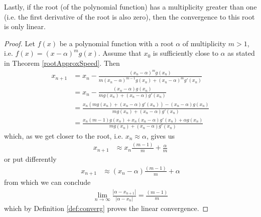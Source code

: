 \documentclass[
  digital, %
  notable,   %
  nolof,     %
  nolot,     %
	final, %
]{fithesis3}
\begin{document}
Lastly, if the root (of the polynomial function) has a multiplicity greater than one (i.e. the first derivative of the root is also zero), then the convergence to this root is only linear.
\begin{proof}
Let $f(x)$ be a polynomial function with a root $\alpha$ of multiplicity $m > 1$, i.e. $f(x) = (x-\alpha)^{m}g(x)$. Assume that $x_{0}$ is sufficiently close to $\alpha$ as stated in Theorem \ref{rootApproxSpeed}. Then
\begin{align}
x_{n+1} &= x_{n} - \frac{(x_{n} - \alpha)^{m}g(x_{n})}{m(x_{n}-\alpha)^{m-1}g(x_{n}) + (x_{n}-\alpha)^{m}g'(x_{n})} \\
&= x_{n} - \frac{(x_{n} - \alpha)g(x_{n})}{mg(x_{n}) + (x_{n}-\alpha)g'(x_{n})} \\
&= \frac{x_{n}(mg(x_{n}) + (x_{n}-\alpha)g'(x_{n})) - (x_{n} - \alpha)g(x_{n})}{mg(x_{n}) + (x_{n}-\alpha)g'(x_{n})} \\
&= \frac{x_{n}(m - 1)g(x_{n}) + x_{n}(x_{n}-\alpha)g'(x_{n}) + {\alpha}g(x_{n})}{mg(x_{n}) + (x_{n}-\alpha)g'(x_{n})}
\end{align}
which, as we get closer to the root, i.e. $x_{n} \approx \alpha$, gives us
\begin{align}
x_{n+1} &\approx x_{n}\frac{(m - 1)}{m}+\frac{\alpha}{m}
\end{align}
or put differently
\begin{align}
x_{n+1} &\approx (x_{n}-\alpha)\frac{(m - 1)}{m}+\alpha
\end{align}
from which we can conclude
\begin{align}
\lim_{n\to\infty}\frac{\left|\alpha - x_{n+1}\right|}{\left|\alpha-x_{n}\right|} = \frac{(m - 1)}{m}
\end{align}
which by Definition \ref{def:converg} proves the linear convergence.
\end{proof}
\end{document}
